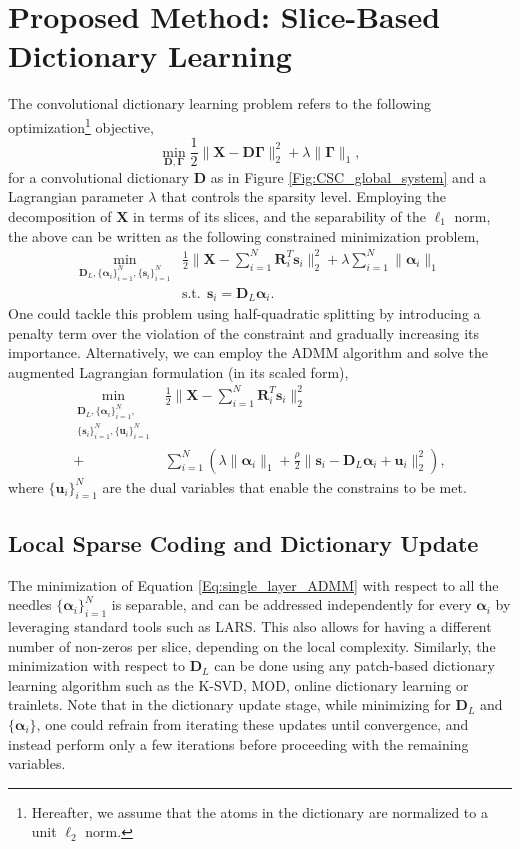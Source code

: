 \documentclass[10pt,twocolumn,letterpaper]{article}
\def\s{{\mathbf s}}
\def\X{{\mathbf X}}
\def\u{ \mathbf{u}}
\def\u{{\mathbf u}}
\def\D{{\mathbf D}}
\def\R{{\mathbf R}}
\def\alfa{{\boldsymbol \alpha}}
\def\Gama{{\boldsymbol \Gamma}}
\begin{document}
\section{Proposed Method: Slice-Based Dictionary Learning} \label{Sec:proposed_algorithm}
The convolutional dictionary learning problem refers to the following optimization\footnote{Hereafter, we assume that the atoms in the dictionary are normalized to a unit $\ell_2$ norm.} objective,
\begin{equation} \label{Eq:conv_SC_DL}
	\min_{\D,\Gama} \frac{1}{2} \| \X - \D\Gama \|_2^2 + \lambda \| \Gama \|_1,
\end{equation}
for a convolutional dictionary $\D$ as in Figure \ref{Fig:CSC_global_system} and a Lagrangian parameter $\lambda$ that controls the sparsity level. Employing the decomposition of $\X$ in terms of its slices, and the separability of the $\ell_1$ norm, the above can be written as the following constrained minimization problem,
\begin{align}
	\min_{\D_L, \{ \alfa_i \}_{i=1}^N, \{ \s_i \}_{i=1}^N } & \frac{1}{2} \| \X - \sum_{i=1}^N \R_i^T \s_i \|_2^2 + \lambda \sum_{i=1}^N \| \alfa_i \|_1 \\
	& \text{s.t.} \ \ \s_i = \D_L \alfa_i.
\end{align}
One could tackle this problem using half-quadratic splitting \cite{geman1995nonlinear} by introducing a penalty term over the violation of the constraint and gradually increasing its importance. Alternatively, we can employ the ADMM algorithm \cite{Boyd2011} and solve the augmented Lagrangian formulation (in its scaled form),
\begin{align} \label{Eq:single_layer_ADMM}
	\min_{ \substack{ \D_L, \{ \alfa_i \}_{i=1}^N, \\ \{ \s_i \}_{i=1}^N, \{\u_i\}_{i=1}^N } } & \frac{1}{2} \| \X - \sum_{i=1}^N \R_i^T \s_i \|_2^2 \\
	+ & \sum_{i=1}^N \left( \lambda \| \alfa_i \|_1 + \frac{\rho}{2} \| \s_i - \D_L \alfa_i + \u_i \|_2^2 \right),
\end{align}
where $\{ \u_i \}_{i=1}^N$ are the dual variables that enable the constrains to be met.

\subsection{Local Sparse Coding and Dictionary Update}
The minimization of Equation \eqref{Eq:single_layer_ADMM} with respect to all the needles $\{ \alfa_i \}_{i=1}^N$ is separable, and can be addressed independently for every $\alfa_i$ by leveraging standard tools such as LARS. This also allows for having a different number of non-zeros per slice, depending on the local complexity. Similarly, the minimization with respect to $\D_L$ can be done using any patch-based dictionary learning algorithm such as the K-SVD, MOD, online dictionary learning or trainlets. Note that in the dictionary update stage, while minimizing for $\D_L$ and $\{\alfa_i\}$, one could refrain from iterating these updates until convergence, and instead perform only a few iterations before proceeding with the remaining variables.
	
\end{document}
